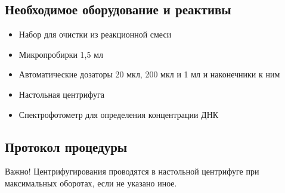 
\subsection*{Необходимое оборудование и реактивы}
\begin{itemize}
    \item Набор для очистки из реакционной смеси
    \item Микропробирки 1,5 мл
    \item Автоматические дозаторы 20 мкл, 200 мкл и 1 мл и наконечники к ним
    \item Настольная центрифуга
    \item Спектрофотометр для определения концентрации ДНК    
\end{itemize}

\subsection*{Протокол процедуры}

Важно! Центрифугирования проводятся в настольной центрифуге при максимальных оборотах, если не указано иное.

